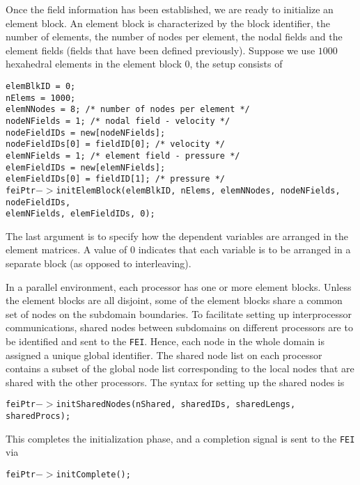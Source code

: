 Once the field information has been established, we are ready to initialize
an element block. An element block is characterized by the block identifier,
the number of elements, the number of nodes per element, the nodal fields 
and the element fields (fields that have been defined previously). Suppose 
we use $1000$ hexahedral elements in the element block $0$, the setup 
consists of
\begin{tabbing}
\hspace{0.5in} \= {\tt elemBlkID = 0;} \\
               \> {\tt nElems = 1000;} \\
               \> {\tt elemNNodes = 8; /* number of nodes per element */} \\
               \> {\tt nodeNFields = 1; /* nodal field - velocity */} \\
               \> {\tt nodeFieldIDs = new[nodeNFields];} \\
               \> {\tt nodeFieldIDs[0] = fieldID[0]; /* velocity */ } \\
               \> {\tt elemNFields = 1; /* element field - pressure */} \\
               \> {\tt elemFieldIDs = new[elemNFields];} \\
               \> {\tt elemFieldIDs[0] = fieldID[1]; /* pressure */ } \\
 \> {\tt feiPtr$->$initElemBlock(elemBlkID, nElems, elemNNodes, nodeNFields, nodeFieldIDs,}\\
 \> \hspace{1.0in} {\tt elemNFields, elemFieldIDs, 0);} 
\end{tabbing}
The last argument is to specify how the dependent variables are arranged in
the element matrices. A value of $0$ indicates that each variable is to be
arranged in a separate block (as opposed to interleaving).

In a parallel environment, each processor has one or more element blocks.
Unless the element blocks are all disjoint, some of the element blocks
share a common set of nodes on the subdomain boundaries. To facilitate
setting up interprocessor communications, shared nodes between subdomains
on different processors are to be identified and sent to the {\tt FEI}.
Hence, each node in the whole domain is assigned a unique global
identifier. The shared node list on each processor contains a subset
of the global node list
corresponding to the local nodes that are shared with the other processors.
The syntax for setting up the shared nodes is
\begin{tabbing}
\hspace{0.5in} \= {\tt feiPtr$->$initSharedNodes(nShared, sharedIDs, sharedLengs, sharedProcs);}
\end{tabbing}
This completes the initialization phase, and a completion signal is sent to
the {\tt FEI} via
\begin{tabbing}
\hspace{0.5in} \= {\tt feiPtr$->$initComplete();}
\end{tabbing}


